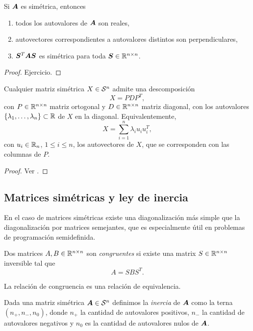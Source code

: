 \begin{prop}
Si $\bm{A}$ es simétrica, entonces
\begin{enumerate}
\item \label{item:realav} todos los autovalores de $\bm{A}$ son reales,
\item autovectores correspondientes a autovalores distintos son perpendiculares,
\item $\bm{S}^T \bm{A} \bm{S}$ es simétrica para toda $\bm{S} \in \mathbb{R}^{n\times n}$.
\end{enumerate}
\end{prop}

\begin{proof}
Ejercicio.
\end{proof}

\begin{theorem}
Cualquier matriz simétrica $X \in {\mathcal S^n}$ admite una descomposición
$$
X = P D P^T,
$$
con $P \in \mathbb{R}^{n\times n}$ matriz ortogonal y $D \in \mathbb{R}^{n\times n}$ matriz diagonal, con los autovalores $\{\lambda_1, \dots, \lambda_n\} \subset \mathbb{R}$ de $X$ en la diagonal. Equivalentemente,
$$
X = \sum_{i=1}^n \lambda_i u_i u_i^T,
$$
con $u_i \in \mathbb{R}_n$, $1 \le i \le n$, los autovectores de $X$, que se corresponden con las columnas de $P$.
\end{theorem}

\begin{proof} Ver \cite[Teorema 4.1.5]{Horn1985}.
\end{proof}

\subsection{Matrices simétricas y ley de inercia}

En el caso de matrices simétricas existe una diagonalización más simple que la diagonalización por matrices semejantes, que es especialmente útil en problemas de programación semidefinida.

\begin{definition}
Dos matrices $A, B \in \mathbb{R}^{n\times n}$ son \emph{congruentes} si existe una matrix $S \in \mathbb{R}^{n\times n}$ inversible tal que
$$
A = S B S^T.
$$
\end{definition}

La relación de congruencia es una relación de equivalencia.

Dada una matriz simétrica $\bm{A} \in {\mathcal S^n}$ definimos la \emph{inercia} de $\bm{A}$ como la terna $(n_+, n_-, n_0)$, donde $n_+$ la cantidad de autovalores positivos, $n_-$ la cantidad de autovalores negativos y $n_0$ es la cantidad de autovalores nulos de $\bm{A}$.

